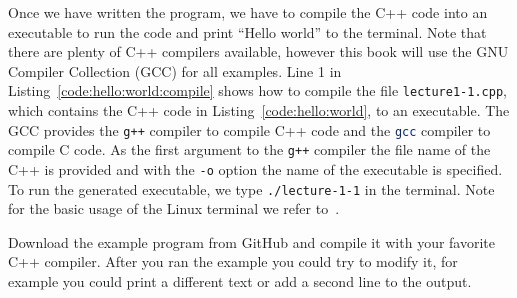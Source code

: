 

Once we have written the program, we have to compile the C++ code into an executable to run the code and print ``Hello world'' to the terminal. Note that there are plenty of C++ compilers available, however this book will use the GNU Compiler Collection (GCC) for all examples. Line 1 in Listing~\ref{code:hello:world:compile} shows how to compile the file \lstinline[language=bash]|lecture1-1.cpp|, which contains the C++ code in Listing~\ref{code:hello:world}, to an executable. The GCC provides the \lstinline[language=bash]{g++} compiler to compile C++ code and the \lstinline[language=bash]{gcc} compiler to compile C code. As the first argument to the \lstinline[language=bash]{g++} compiler the file name of the C++ is provided and with the \lstinline[language=bash]|-o| option the name of the executable is specified. To run the generated executable, we type \lstinline[language=bash]|./lecture-1-1| in the terminal. Note for the basic usage of the Linux terminal we refer to~\cite{newham2005learning,robbins2016bash}.



\begin{exercise}
Download the example program from GitHub and compile it with your favorite C++ compiler. After you ran the example you could try to modify it, for example you could print a different text or add a second line to the output.
\end{exercise}


